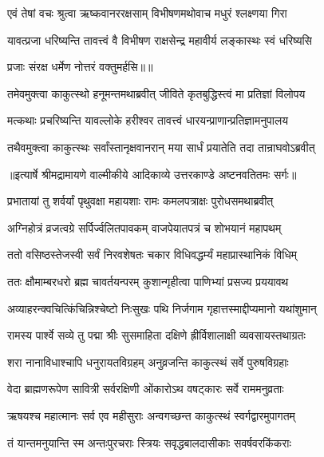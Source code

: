 \twolineshloka
{एवं तेषां वचः श्रुत्वा ऋष्कवानररक्षसाम्}
{विभीषणमथोवाच मधुरं श्लक्ष्णया गिरा} %

\twolineshloka
{यावत्प्रजा धरिष्यन्ति तावत्त्वं वै विभीषण}
{राक्षसेन्द्र महावीर्य लङ्कास्थः स्वं धरिष्यसि} %

{प्रजाः संरक्ष धर्मेण नोत्तरं वक्तुमर्हसि॥॥} %

\addtocounter{shlokacount}{1}

\twolineshloka
{तमेवमुक्त्वा काकुत्स्थो हनूमन्तमथाब्रवीत्}
{जीविते कृतबुद्धिस्त्वं मा प्रतिज्ञां विलोपय} %

\twolineshloka
{मत्कथाः प्रचरिष्यन्ति यावल्लोके हरीश्वर}
{तावत्त्वं धारयन्प्राणान्प्रतिज्ञामनुपालय} %

\twolineshloka
{तथैवमुक्त्वा काकुत्स्थः सर्वांस्तानृक्षवानरान्}
{मया सार्धं प्रयातेति तदा तान्राघवोऽब्रवीत्} %


{॥इत्यार्षे श्रीमद्रामायणे वाल्मीकीये आदिकाव्ये उत्तरकाण्डे अष्टनवतितमः सर्गः॥}


\twolineshloka
{प्रभातायां तु शर्वर्यां पृथुवक्षा महायशाः}
{रामः कमलपत्राक्षः पुरोधसमथाब्रवीत्} %

\twolineshloka
{अग्निहोत्रं व्रजत्वग्रे सर्पिर्ज्वलितपावकम्}
{वाजपेयातपत्रं च शोभयानं महापथम्} %

\twolineshloka
{ततो वसिष्ठस्तेजस्वी सर्वं निरवशेषतः}
{चकार विधिवद्धर्म्यं महाप्रास्थानिकं विधिम्} %

\twolineshloka
{ततः क्षौमाम्बरधरो ब्रह्म चावर्तयन्परम्}
{कुशान्गृहीत्वा पाणिभ्यां प्रसज्य प्रययावथ} %

\twolineshloka
{अव्याहरन्क्वचित्किंचिन्निश्चेष्टो निःसुखः पथि}
{निर्जगाम गृहात्तस्माद्दीप्यमानो यथांशुमान्} %

\twolineshloka
{रामस्य पार्श्वे सव्ये तु पद्मा श्रीः सुसमाहिता}
{दक्षिणे ह्रीर्विशालाक्षी व्यवसायस्तथाग्रतः} %

\twolineshloka
{शरा नानाविधाश्चापि धनुरायतविग्रहम्}
{अनुव्रजन्ति काकुत्स्थं सर्वे पुरुषविग्रहाः} %

\twolineshloka
{वेदा ब्राह्मणरूपेण सावित्री सर्वरक्षिणी}
{ओंकारोऽथ वषट्कारः सर्वे राममनुव्रताः} %

\twolineshloka
{ऋषयश्च महात्मानः सर्व एव महीसुराः}
{अन्वगच्छन्त काकुत्स्थं स्वर्गद्वारमुपागतम्} %

\twolineshloka
{तं यान्तमनुयान्ति स्म अन्तःपुरचराः स्त्रियः}
{सवृद्धबालदासीकाः सवर्षवरकिंकराः} %

